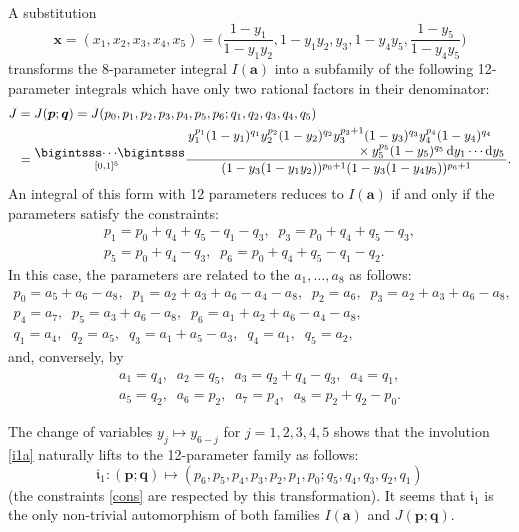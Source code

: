 \documentclass[12pt,reqno]{amsart}
\theoremstyle{remark}
\renewcommand{\d}{{\mathrm d}}
\newcommand\ba{\boldsymbol a}
\newcommand\bx{\boldsymbol x}
\newcommand\bp{\boldsymbol p}
\newcommand\bq{\boldsymbol q}
\newcommand\fri{\mathfrak i}
\begin{document}
A  substitution
\[
\bx=(x_1,x_2,x_3,x_4,x_5)=
\bigg(\frac{1-y_1}{1-y_1y_2},1-y_1y_2,y_3,1-y_4y_5,\frac{1-y_5}{1-y_4y_5}\bigg)
\]
transforms the 8-parameter integral $I(\ba)$ into a subfamily of  the following 12-parameter  integrals which have  only two rational factors in their denominator:
\begin{align}
J
&=J(\bp;\bq)=J(p_0,p_1,p_2,p_3,p_4,p_5,p_6;q_1,q_2,q_3,q_4,q_5)
\nonumber\\
&=\raisebox{1.8mm}{$\displaystyle\mathop{\bigintsss\!\dotsb\!\bigintsss}_{[0,1]^5\;\;}$}
\frac{\splitfrac{y_1^{p_1}(1-y_1)^{q_1}y_2^{p_2}(1-y_2)^{q_2}y_3^{p_3+1}(1-y_3)^{q_3}y_4^{p_4}(1-y_4)^{q_4}}{\times y_5^{p_5}(1-y_5)^{q_5}\,\d y_1\dotsb\d y_5}}
{(1-y_3(1-y_1y_2))^{p_0+1}(1-y_3(1-y_4y_5))^{p_6+1}}.
\label{J1}
\end{align}
An integral of this form  with 12 parameters reduces to $I(\ba)$ if and only if the   parameters satisfy   the constraints:
\begin{equation}
\begin{gathered}
p_1=p_0+q_4+q_5-q_1-q_3, \;\;
p_3=p_0+q_4+q_5-q_3, \\
p_5=p_0+q_4-q_3, \;\;
p_6=p_0+q_4+q_5-q_1-q_2.
\end{gathered}
\label{cons}
\end{equation}
In this case, the parameters are related  to the $a_1,\ldots, a_8$ as follows: 
\begin{gather*}
p_0=a_5+a_6-a_8, \;\;
p_1=a_2+a_3+a_6-a_4-a_8, \;\;
p_2=a_6, \;\;
p_3=a_2+a_3+a_6-a_8, \\
p_4=a_7, \;\;
p_5=a_3+a_6-a_8, \;\;
p_6=a_1+a_2+a_6-a_4-a_8, \\
q_1=a_4, \;\;
q_2=a_5, \;\;
q_3=a_1+a_5-a_3, \;\;
q_4=a_1, \;\;
q_5=a_2,
\end{gather*}
and, conversely, by 
\begin{gather*}
a_1=q_4, \;\;
a_2=q_5, \;\;
a_3=q_2+q_4-q_3, \;\;
a_4=q_1, \\
a_5=q_2, \;\;
a_6=p_2, \;\;
a_7=p_4, \;\;
a_8=p_2+q_2-p_0.
\end{gather*}

The change of variables $y_j\mapsto y_{6-j}$ for $j=1,2,3,4,5$ shows that the involution \eqref{i1a} naturally lifts to the 12-parameter family as follows:
\begin{equation}
\fri_1\colon(\bp;\bq)\mapsto(p_6,p_5,p_4,p_3,p_2,p_1,p_0;q_5,q_4,q_3,q_2,q_1)
\label{i1pq}
\end{equation}
(the constraints \eqref{cons} are respected by this transformation).
It seems that $\fri_1$ is the only non-trivial automorphism of both families $I(\ba)$ and $J(\bp;\bq)$.
\end{document}
